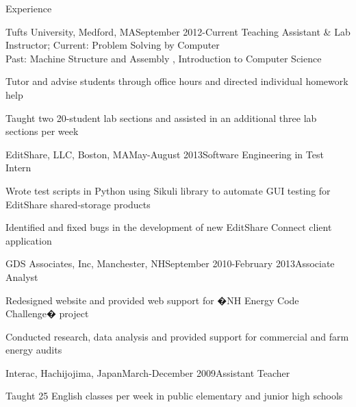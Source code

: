 \documentclass{resume} %
\begin{document}
\begin{rSection}{Experience}

\begin{rSubsection}{Tufts University, Medford, MA}{September 2012-Current} {Teaching Assistant \& Lab Instructor; Current: Problem Solving by Computer}{\\ Past: Machine Structure and Assembly , Introduction to Computer Science}

\item Tutor and advise students through office hours and directed individual homework help
\item Taught two 20-student lab sections and assisted in an additional three lab sections per week
\end{rSubsection}


\begin{rSubsection}{EditShare, LLC, Boston, MA}{May-August 2013}{Software Engineering in Test Intern}{}
\item Wrote test scripts in Python using Sikuli library to automate GUI testing for EditShare shared-storage products
\item Identified and fixed bugs in the development of new EditShare Connect client application
\end{rSubsection}


\begin{rSubsection}{GDS Associates, Inc, Manchester, NH}{September 2010-February 2013}{Associate Analyst}{}
\item Redesigned website and provided web support for �NH Energy Code Challenge� project
\item Conducted research, data analysis and provided support for commercial and farm energy audits
\end{rSubsection}


\begin{rSubsection}{Interac, Hachijojima, Japan}{March-December 2009}{Assistant  Teacher}{}
\item Taught 25 English classes per week in public elementary and junior high schools
\end{rSubsection}

\end{rSection}
\end{document}
